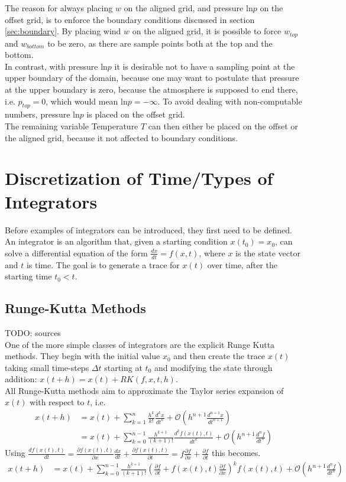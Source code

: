 The reason for always placing $w$ on the aligned grid, and pressure $\text{ln}p$ on the offset grid, is to enforce the boundary conditions discussed in section \ref{sec:boundary}.
By placing wind $w$ on the aligned grid, it is possible to force $w_{top}$ and $w_{bottom}$ to be zero, as there are sample points both at the top and the bottom.\\
In contrast, with pressure $\text{ln}p$ it is desirable not to have a sampling point at the upper boundary of the domain, because one may want to postulate that pressure at the upper boundary is zero, because the atmosphere is supposed to end there, i.e. $p_{top}=0$, which would mean $\text{ln}p = -\infty$.
To avoid dealing with non-computable numbers, pressure $\text{ln}p$ is placed on the offset grid.\\
The remaining variable Temperature $T$ can then either be placed on the offset or the aligned grid, because it not affected to boundary conditions.

\section{Discretization of Time/Types of Integrators}
Before examples of integrators can be introduced, they first need to be defined.
An integrator is an algorithm that, given a starting condition $x(t_0) = x_0$, can solve a differential equation of the form $\frac{dx}{dt} = f(x,t)$, where $x$ is the state vector and $t$ is time.
The goal is to generate a trace for $x(t)$ over time, after the starting time $t_0<t$.

\subsection{Runge-Kutta Methods}
TODO: sources\\
One of the more simple classes of integrators are the explicit Runge Kutta methods.
They begin with the initial value $x_0$ and then create the trace $x(t)$ taking small time-steps $\Delta t$ starting at $t_0$ and modifying the state through addition: $x(t+h) = x(t) + RK(f,x,t,h)$.\\
All Runge-Kutta methods aim to approximate the Taylor series expansion of $x(t)$ with respect to $t$, i.e.
\begin{align*}
x(t+h) &= x(t) + \sum_{k=1}^{n}\frac{h^k}{k!}\frac{d^kx}{dt^k} + \mathcal{O} \left(h^{n+1}\frac{d^{n+1}x}{dt^{n+1}}\right)\\
&= x(t)+ \sum_{k=0}^{n-1}\frac{h^{k+1}}{(k+1)!}\frac{d^kf(x(t),t)}{dt^k} + \mathcal{O}\left(h^{n+1}\frac{d^{n}f}{dt^{n}}\right)
\end{align*}
Using $\frac{df(x(t),t)}{dt} 
= \frac{\partial f(x(t),t)}{\partial x}\frac{dx}{dt}+\frac{\partial f(x(t),t)}{\partial t} 
= f\frac{\partial f}{\partial x}+\frac{\partial f}{\partial t}$
this becomes.
\begin{align*}
x(t+h) &= x(t)+ \sum_{k=0}^{n-1}\frac{h^{k+1}}{(k+1)!}\left(\frac{\partial f}{\partial t} + f(x(t),t)\frac{\partial f}{\partial x}\right)^kf(x(t),t) + \mathcal{O}\left(h^{n+1}\frac{d^{n}f}{dt^{n}}\right)
\end{align*}


